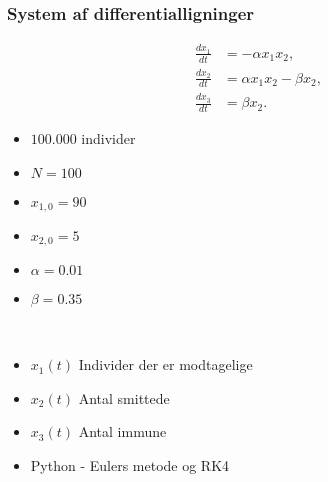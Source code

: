 \begin{frame}
\frametitle{System af differentialligninger}
\begin{minipage}[t]{0.50\textwidth}
\begin{align}
\frac{dx_1}{dt} & = - \alpha x_1 x_2, \\
\frac{dx_2}{dt} & = \alpha x_1 x_2 - \beta x_2 , \\
\frac{dx_3}{dt} & = \beta x_2.
\end{align}
\end{minipage}
\begin{minipage}[t]{0.45\textwidth}
\begin{itemize}
\item $100.000$ individer 
\item $N = 100$ 
\item $x_{1,0} = 90$ 
\item $x_{2,0} = 5 $
\item $\alpha = 0.01$ 
\item $\beta = 0.35$
\end{itemize}
\phantom{H}
\end{minipage}
\\
\begin{itemize}
\item $x_1(t)$ Individer der er modtagelige 
\item $x_2(t)$ Antal smittede 
\item $x_3(t)$ Antal immune 
\item Python - Eulers metode og RK4
\end{itemize}
\end{frame}
